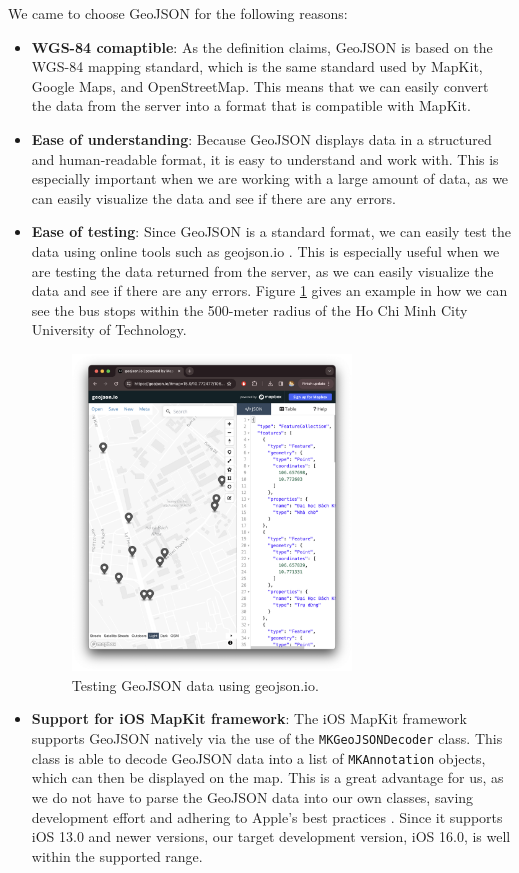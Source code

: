 We came to choose GeoJSON for the following reasons:
\begin{itemize}
    \item \textbf{WGS-84 comaptible}: As the definition claims, GeoJSON is based on the WGS-84 mapping standard, which is the same standard used by MapKit, Google Maps, and OpenStreetMap. This means that we can easily convert the data from the server into a format that is compatible with MapKit.
    \item \textbf{Ease of understanding}: Because GeoJSON displays data in a structured and human-readable format, it is easy to understand and work with. This is especially important when we are working with a large amount of data, as we can easily visualize the data and see if there are any errors.
    \item \textbf{Ease of testing}: Since GeoJSON is a standard format, we can easily test the data using online tools such as geojson.io \cite{mapbox_geojsonio}. This is especially useful when we are testing the data returned from the server, as we can easily visualize the data and see if there are any errors. Figure \ref{fig:geojson_io} gives an example in how we can see the bus stops within the 500-meter radius of the Ho Chi Minh City University of Technology.
    \begin{figure}[H]
        \centering
        \includegraphics[width=0.7\textwidth]{assets/images/Research/geojson/geojsonio.png}
        \caption{Testing GeoJSON data using geojson.io.}
        \label{fig:geojson_io}
    \end{figure}
    \item \textbf{Support for iOS MapKit framework}: The iOS MapKit framework supports GeoJSON natively via the use of the \lstinline{MKGeoJSONDecoder} class. This class is able to decode GeoJSON data into a list of \lstinline{MKAnnotation} objects, which can then be displayed on the map. This is a great advantage for us, as we do not have to parse the GeoJSON data into our own classes, saving development effort and adhering to Apple's best practices \cite{mkgeojsonobject}. Since it supports iOS 13.0 and newer versions, our target development version, iOS 16.0, is well within the supported range.
\end{itemize}

